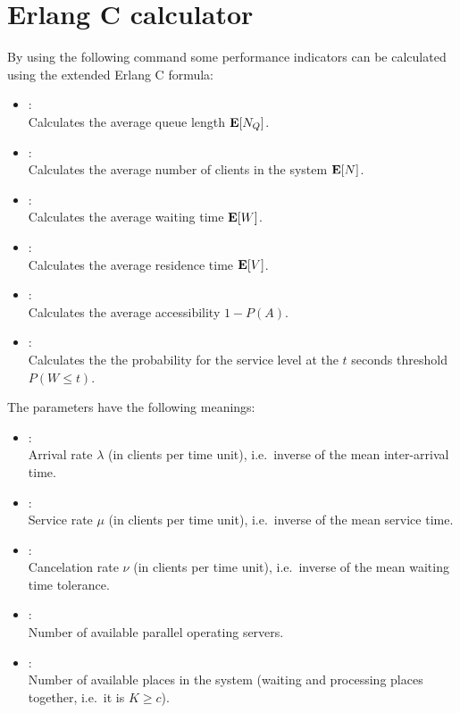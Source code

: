 \chapter{Erlang C calculator}

By using the following command some performance indicators can be calculated
using the extended Erlang C formula:

\begin{itemize}

\item
{}:\\
Calculates the average queue length ${\bf E}[N_Q]$. 

\item
{}:\\
Calculates the average number of clients in the system ${\bf E}[N]$.

\item
{}:\\
Calculates the average waiting time ${\bf E}[W]$.

\item
{}:\\
Calculates the average residence time ${\bf E}[V]$.

\item
{}:\\
Calculates the average accessibility $1-P(A)$.

\item
{}:\\
Calculates the the probability for the service level at the $t$ seconds threshold $P(W\le t)$.

\end{itemize}

The parameters have the following meanings:
\begin{itemize}
\item
{}:\\
Arrival rate $\lambda$ (in clients per time unit), i.e.\ inverse of the mean inter-arrival time.
\item
{}:\\
Service rate $\mu$ (in clients per time unit), i.e.\ inverse of the mean service time.
\item
{}:\\
Cancelation rate $\nu$ (in clients per time unit), i.e.\ inverse of the mean waiting time tolerance.
\item
{}:\\
Number of available parallel operating servers.
\item
{}:\\
Number of available places in the system (waiting and processing places together, i.e.\ it is $K\ge c$).
\end{itemize}



